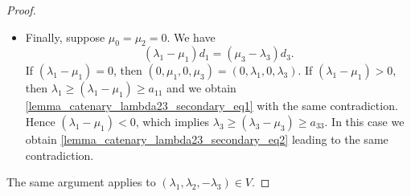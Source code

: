 \documentclass[12pt]{article}
\theoremstyle{remark}
\begin{document}
\begin{proof}
\begin{itemize}
    If $\mu_3 \geq \lambda_3$, then
    \begin{equation}
         (\lambda_1-\mu_1)d_1 = (\mu_3-\lambda_3)d_3 + \mu_2d_2
    \end{equation}
    where all coefficients above are nonnegative. If $(\lambda_1-\mu_1) = 0$, then $(\mu_0,\mu_1,\mu_2,\mu_3) = (0,\lambda_1,0,\lambda_3)$. Thus, suppose $(\lambda_1-\mu_1) > 0$, which implies $\lambda_1 \geq (\lambda_1-\mu_1) \geq a_{11}$. Now, as $\lambda_0 < a_{00}$, we have
    \begin{equation}\label{lemma_catenary_lambda23_secondary_eq1}
        \lambda_2d_2 = (a_{00}-\lambda_0)d_0 + (\lambda_1 - a_{11})d_1 + \lambda_3d_3
    \end{equation}
    where all coefficients above are nonnegative, which contradicts $\lambda_2 < a_{22}$.

    Hence $\mu_1 < \lambda_1$ and $\mu_3 < \lambda_3$. We have
    \begin{equation}
         \lambda_0d_0 = \mu_1d_1 + (\mu_2 - \lambda_2)d_2 + \mu_3d_3.
    \end{equation}
     By Lemma \ref{lemma_procedure_1}, no cube labeled with an element of the Ap{\'e}ry set is in the region associated to $(\mu_1,\mu_2-\lambda_2,\mu_3)$. If $(\mu_2 - \lambda_2) \leq 0$, this gives a contradiction with the fact $[[\lambda_1-1,0,\lambda_3-1]] \in T$, which holds since $(\lambda_1,-\lambda_2,\lambda_3) \in V$. Hence $(\mu_2 - \lambda_2) > 0$, which gives $\lambda_0 \geq a_{00}$ --- contradiction.

    \item 
    Finally, suppose $\mu_0 = \mu_2 = 0$. We have
    \begin{equation}
        (\lambda_1 - \mu_1)d_1 = (\mu_3 - \lambda_3)d_3.
    \end{equation}
    If $(\lambda_1 - \mu_1) = 0$, then $(0,\mu_1,0,\mu_3) = (0,\lambda_1,0,\lambda_3)$. 
    If $(\lambda_1 - \mu_1) > 0$, then $\lambda_1 \geq (\lambda_1 - \mu_1) \geq a_{11}$ and we obtain \eqref{lemma_catenary_lambda23_secondary_eq1} with the same contradiction.
    Hence $(\lambda_1 - \mu_1) < 0$, which implies $\lambda_3 \geq (\lambda_3 - \mu_3) \geq a_{33} $. In this case we obtain \eqref{lemma_catenary_lambda23_secondary_eq2} leading to the same contradiction.
    \end{itemize}



The same argument applies to $(\lambda_1,\lambda_2,-\lambda_3) \in V$. 
\end{proof}
\end{document}
